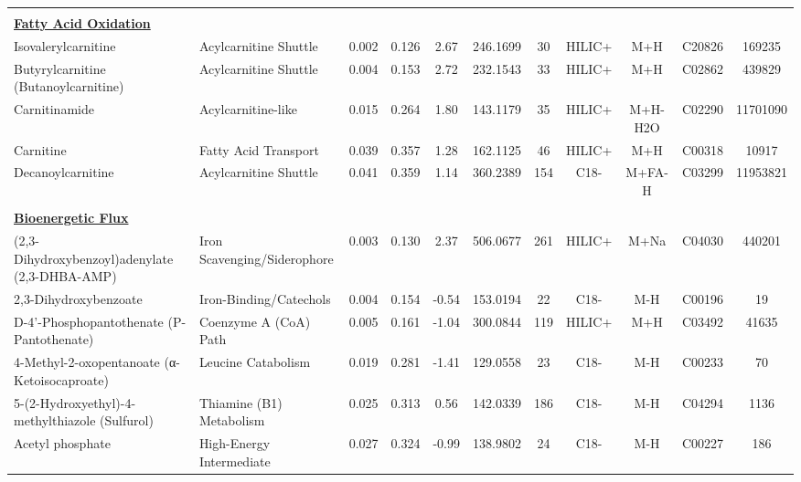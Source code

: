 \begin{longtable}[t]{llccccccccc}
 &  &  &  &  &  &  &  &  &  & \\
\fontsize{9pt}{10.8pt}\selectfont\textbf{\underline{Fatty Acid Oxidation}} &  &  &  &  &  &  &  &  &  & \\
\hspace*{0.3cm}Isovalerylcarnitine & Acylcarnitine Shuttle & 0.002 & 0.126 & 2.67 & 246.1699 & 30 & HILIC+ & M+H & C20826 & 169235\\
\hspace*{0.3cm}Butyrylcarnitine (Butanoylcarnitine) & Acylcarnitine Shuttle & 0.004 & 0.153 & 2.72 & 232.1543 & 33 & HILIC+ & M+H & C02862 & 439829\\
\hspace*{0.3cm}Carnitinamide & Acylcarnitine-like & 0.015 & 0.264 & 1.80 & 143.1179 & 35 & HILIC+ & M+H-H2O & C02290 & 11701090\\

\hspace*{0.3cm}Carnitine & Fatty Acid Transport & 0.039 & 0.357 & 1.28 & 162.1125 & 46 & HILIC+ & M+H & C00318 & 10917\\
\hspace*{0.3cm}Decanoylcarnitine & Acylcarnitine Shuttle & 0.041 & 0.359 & 1.14 & 360.2389 & 154 & C18- & M+FA-H & C03299 & 11953821\\
 &  &  &  &  &  &  &  &  &  & \\
\fontsize{9pt}{10.8pt}\selectfont\textbf{\underline{Bioenergetic Flux}} &  &  &  &  &  &  &  &  &  & \\
\hspace*{0.3cm}(2,3-Dihydroxybenzoyl)adenylate (2,3-DHBA-AMP) & Iron Scavenging/Siderophore & 0.003 & 0.130 & 2.37 & 506.0677 & 261 & HILIC+ & M+Na & C04030 & 440201\\

\hspace*{0.3cm}2,3-Dihydroxybenzoate & Iron-Binding/Catechols & 0.004 & 0.154 & -0.54 & 153.0194 & 22 & C18- & M-H & C00196 & 19\\
\hspace*{0.3cm}D-4'-Phosphopantothenate (P-Pantothenate) & Coenzyme A (CoA) Path & 0.005 & 0.161 & -1.04 & 300.0844 & 119 & HILIC+ & M+H & C03492 & 41635\\
\hspace*{0.3cm}4-Methyl-2-oxopentanoate (α-Ketoisocaproate) & Leucine Catabolism & 0.019 & 0.281 & -1.41 & 129.0558 & 23 & C18- & M-H & C00233 & 70\\
\hspace*{0.3cm}5-(2-Hydroxyethyl)-4-methylthiazole (Sulfurol) & Thiamine (B1) Metabolism & 0.025 & 0.313 & 0.56 & 142.0339 & 186 & C18- & M-H & C04294 & 1136\\
\hspace*{0.3cm}Acetyl phosphate & High-Energy Intermediate & 0.027 & 0.324 & -0.99 & 138.9802 & 24 & C18- & M-H & C00227 & 186\\


\end{longtable}
